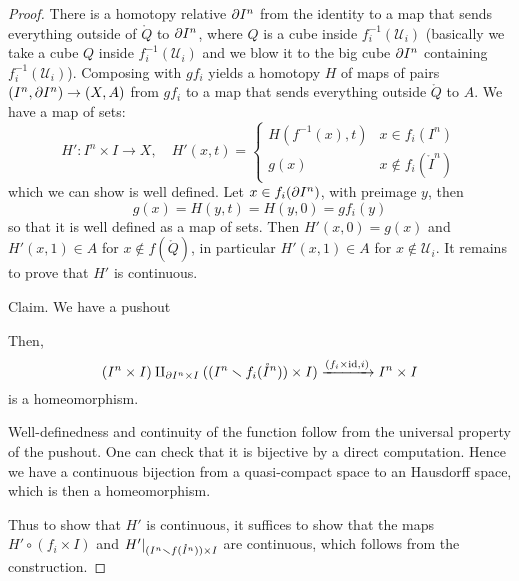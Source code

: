 \begin{proof}
There is a homotopy relative $\partial I^n$ from the identity to a map that sends everything outside of $\ring Q$ to $\partial I^n$, where $Q$ is a cube inside $f^{-1}_i(\mathcal{U}_i)$ (basically we take a cube $Q$ inside $f^{-1}_i(\mathcal{U}_i)$ and we blow it to the big cube $\partial I^n$ containing $f^{-1}_i(\mathcal{U}_i)$). Composing with $gf_i$ yields a homotopy $H$ of maps of pairs $(I^n,\partial I^n)\to(X,A)$ from $gf_i$ to a map that sends everything outside $\ring Q$ to $A$. We have a map of sets:
\[H':I^n\times I\to X,\quad H'(x,t)=\begin{cases}H(f^{-1}(x),t) & x\in f_i(I^n) \\ g(x) & x\not\in f_i(\mathring{I}^n)\end{cases}\]
which we can show is well defined. Let $x\in f_i(\partial I^n)$, with preimage $y$, then\normalmarginpar{} \[g(x)=H(y,t)=H(y,0)=gf_i(y)\] so that it is well defined as a map of sets. Then $H'(x,0)=g(x)$ and $H'(x,1)\in A$ for $x\not\in f(\mathring{Q})$, in particular $H'(x,1)\in A$ for $x\not\in\mathcal{U}_i$. It remains to prove that $H'$ is continuous.

Claim. We have a pushout
\begin{center}
\end{center}
Then,
\[(I^n\times I)\amalg_{\partial I^n\times I} ((I^n\smallsetminus f_i(\mathring{I}^n))\times I)\xrightarrow{(f_i\times\operatorname{id},i)} I^n\times I\]
is a homeomorphism.

\begin{claimproof}
Well-definedness and continuity of the function follow from the universal property of the pushout. One can check that it is bijective by a direct computation. Hence we have a continuous bijection from a quasi-compact space to an Hausdorff space, which is then a homeomorphism. 
\end{claimproof}

Thus to show that $H'$ is continuous, it suffices to show that the maps $H'\circ (f_i\times I)$ and $H'|_{(I^n\smallsetminus f(\mathring I^n))\times I}$ are continuous, which follows from the construction.
\end{proof}

